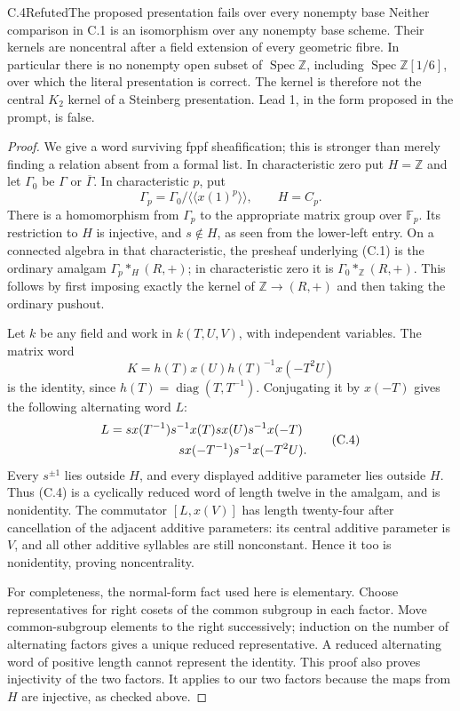 \begin{statement}{C.4}{Refuted}{The proposed presentation fails over every nonempty base}
Neither comparison in C.1 is an isomorphism over any nonempty base
scheme. Their kernels are noncentral after a field extension of every
geometric fibre. In particular there is no nonempty open subset of
$\operatorname{Spec}\mathbb Z$, including $\operatorname{Spec}
\mathbb Z[1/6]$, over which the literal presentation is correct.
The kernel is therefore not the central $K_2$ kernel of a Steinberg
presentation. Lead 1, in the form proposed in the prompt, is false.
\end{statement}
\begin{proof}
We give a word surviving fppf sheafification; this is stronger than
merely finding a relation absent from a formal list. In characteristic
zero put $H=\mathbb Z$ and let $\Gamma_0$ be $\Gamma$ or
$\overline\Gamma$. In characteristic $p$, put
\[
 \Gamma_p=\Gamma_0/\langle\!\langle x(1)^p\rangle\!\rangle,
 \qquad H=C_p.
\]
There is a homomorphism from $\Gamma_p$ to the appropriate matrix
group over $\mathbb F_p$. Its restriction to $H$ is injective, and
$s\notin H$, as seen from the lower-left entry. On a connected
algebra in that characteristic, the presheaf underlying (C.1) is the
ordinary amalgam $\Gamma_p*_{H}(R,+)$; in characteristic zero it is
$\Gamma_0*_{\mathbb Z}(R,+)$. This follows by first imposing exactly
the kernel of $\mathbb Z\to(R,+)$ and then taking the ordinary pushout.

Let $k$ be any field and work in $k(T,U,V)$, with independent variables.
The matrix word
\[
 K=h(T)x(U)h(T)^{-1}x(-T^2U)
\]
is the identity, since $h(T)=\operatorname{diag}(T,T^{-1})$.
Conjugating it by $x(-T)$ gives the following alternating word $L$:
\[
 \begin{split}
 L={}&s x(T^{-1})s^{-1}x(T)s x(U)s^{-1}x(-T)\\
     &\hspace{15mm}{}s x(-T^{-1})s^{-1}x(-T^2U).
 \end{split}
 \tag{C.4}
\]
Every $s^{\pm1}$ lies outside $H$, and every displayed additive
parameter lies outside $H$. Thus (C.4) is a cyclically reduced word
of length twelve in the amalgam, and is nonidentity. The commutator
$[L,x(V)]$ has length twenty-four after cancellation of the adjacent
additive parameters: its central additive parameter is $V$, and all
other additive syllables are still nonconstant. Hence it too is
nonidentity, proving noncentrality.

For completeness, the normal-form fact used here is elementary.
Choose representatives for right cosets of the common subgroup in
each factor. Move common-subgroup elements to the right successively;
induction on the number of alternating factors gives a unique reduced
representative. A reduced alternating word of positive length cannot
represent the identity. This proof also proves injectivity of the two
factors. It applies to our two factors because the maps from $H$ are
injective, as checked above.


\end{proof}
